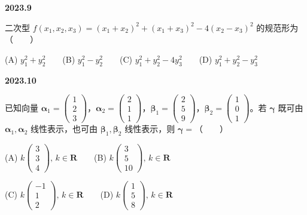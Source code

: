 \documentclass[UTF8,12pt,fontset=windows]{ctexart}
\begin{document}
\vfill
\newpage
{\large\bfseries 2023.9}

二次型 $f(x_1, x_2, x_3) = (x_1 + x_2)^2 + (x_1 + x_3)^2 - 4(x_2 - x_3)^2$ 的规范形为（　　）

(A) $y_1^2 + y_2^2$　　(B) $y_1^2 - y_2^2$　　(C) $y_1^2 + y_2^2 - 4y_3^2$　　(D) $y_1^2 + y_2^2 - y_3^2$

\vfill
\newpage
{\large\bfseries 2023.10}

已知向量 $\boldsymbol{\alpha}_1 = \begin{pmatrix} 1 \\ 2 \\ 3 \end{pmatrix}$，$\boldsymbol{\alpha}_2 = \begin{pmatrix} 2 \\ 1 \\ 1 \end{pmatrix}$，$\boldsymbol{\beta}_1 = \begin{pmatrix} 2 \\ 5 \\ 9 \end{pmatrix}$，$\boldsymbol{\beta}_2 = \begin{pmatrix} 1 \\ 0 \\ 1 \end{pmatrix}$。若 $\boldsymbol{\gamma}$ 既可由 $\boldsymbol{\alpha}_1, \boldsymbol{\alpha}_2$ 线性表示，也可由 $\boldsymbol{\beta}_1, \boldsymbol{\beta}_2$ 线性表示，则 $\boldsymbol{\gamma} =$（　　）

(A) $k\begin{pmatrix} 3 \\ 3 \\ 4 \end{pmatrix},\, k \in \boldsymbol{R}$　　(B) $k\begin{pmatrix} 3 \\ 5 \\ 10 \end{pmatrix},\, k \in \boldsymbol{R}$

(C) $k\begin{pmatrix} -1 \\ 1 \\ 2 \end{pmatrix},\, k \in \boldsymbol{R}$　　(D) $k\begin{pmatrix} 1 \\ 5 \\ 8 \end{pmatrix},\, k \in \boldsymbol{R}$
\end{document}
